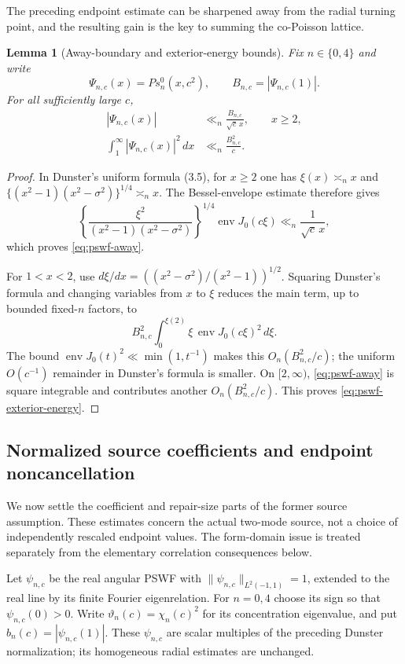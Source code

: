 \documentclass[11pt]{article}
\newtheorem{lemma}[theorem]{Lemma}
\theoremstyle{remark}
\begin{document}
The preceding endpoint estimate can be sharpened away from the radial turning point, and the resulting gain is the key to summing the co-Poisson lattice.

\begin{lemma}[Away-boundary and exterior-energy bounds]\label{lem:pswf-away-energy}
Fix $n\in\{0,4\}$ and write
\[
 \Psi_{n,c}(x)=Ps_n^0(x,c^2),\qquad B_{n,c}=|\Psi_{n,c}(1)|.
\]
For all sufficiently large $c$,
\begin{align}
 |\Psi_{n,c}(x)|&\ll_n \frac{B_{n,c}}{\sqrt c\,x},\qquad x\ge2,\label{eq:pswf-away}\\
 \int_1^\infty |\Psi_{n,c}(x)|^2\,dx&\ll_n \frac{B_{n,c}^2}{c}.\label{eq:pswf-exterior-energy}
\end{align}
\end{lemma}
\begin{proof}
In Dunster's uniform formula (3.5), for $x\ge2$ one has $\xi(x)\asymp_n x$ and
$\{(x^2-1)(x^2-\sigma^2)\}^{1/4}\asymp_n x$.  The Bessel-envelope estimate therefore gives
\[
 \left\{\frac{\xi^2}{(x^2-1)(x^2-\sigma^2)}\right\}^{1/4}
 \operatorname{env}J_0(c\xi)
 \ll_n \frac1{\sqrt c\,x},
\]
which proves \eqref{eq:pswf-away}.

For $1<x<2$, use $d\xi/dx=((x^2-\sigma^2)/(x^2-1))^{1/2}$.  Squaring Dunster's formula and changing variables from $x$ to $\xi$ reduces the main term, up to bounded fixed-$n$ factors, to
\[
 B_{n,c}^2\int_0^{\xi(2)}
 \xi\,\operatorname{env}J_0(c\xi)^2\,d\xi.
\]
The bound $\operatorname{env}J_0(t)^2\ll\min(1,t^{-1})$ makes this $O_n(B_{n,c}^2/c)$; the uniform $O(c^{-1})$ remainder in Dunster's formula is smaller.  On $[2,\infty)$, \eqref{eq:pswf-away} is square integrable and contributes another $O_n(B_{n,c}^2/c)$.  This proves \eqref{eq:pswf-exterior-energy}.
\end{proof}

\subsection{Normalized source coefficients and endpoint noncancellation}
We now settle the coefficient and repair-size parts of the former source
assumption. These estimates concern the actual two-mode source, not a
choice of independently rescaled endpoint values. The form-domain issue
is treated separately from the elementary correlation consequences below.

Let $\psi_{n,c}$ be the real angular PSWF with
$\|\psi_{n,c}\|_{L^2(-1,1)}=1$, extended to the real line by its finite
Fourier eigenrelation. For $n=0,4$ choose its sign so that
$\psi_{n,c}(0)>0$. Write $\vartheta_n(c)=\chi_n(c)^2$ for its
concentration eigenvalue, and put $b_n(c)=|\psi_{n,c}(1)|$.
These $\psi_{n,c}$ are scalar multiples of the preceding Dunster
normalization; its homogeneous radial estimates are unchanged.
\end{document}
